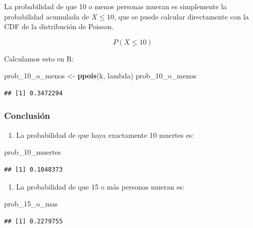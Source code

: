 \documentclass[
]{article}
\newenvironment{Shaded}{\begin{snugshade}}{\end{snugshade}}
\newcommand{\FunctionTok}[1]{\textcolor[rgb]{0.13,0.29,0.53}{\textbf{#1}}}
\newcommand{\NormalTok}[1]{#1}
\newcommand{\OtherTok}[1]{\textcolor[rgb]{0.56,0.35,0.01}{#1}}
\providecommand{\tightlist}{%
  \setlength{\itemsep}{0pt}\setlength{\parskip}{0pt}}
\begin{document}
La probabilidad de que 10 o menos personas mueran es simplemente la probabilidad acumulada de \(X \leq 10\), que se puede calcular directamente con la CDF de la distribución de Poisson.

\[ P(X \leq 10) \]

Calculamos esto en R:

\begin{Shaded}
\begin{Highlighting}[]
\NormalTok{prob\_10\_o\_menos }\OtherTok{\textless{}{-}} \FunctionTok{ppois}\NormalTok{(k, lambda)}
\NormalTok{prob\_10\_o\_menos}
\end{Highlighting}
\end{Shaded}

\begin{verbatim}
## [1] 0.3472294
\end{verbatim}

\subsubsection{Conclusión}\label{conclusiuxf3n}

\begin{enumerate}
\def\labelenumi{\arabic{enumi}.}
\tightlist
\item
  La probabilidad de que haya exactamente 10 muertes es:
\end{enumerate}

\begin{Shaded}
\begin{Highlighting}[]
\NormalTok{prob\_10\_muertes}
\end{Highlighting}
\end{Shaded}

\begin{verbatim}
## [1] 0.1048373
\end{verbatim}

\begin{enumerate}
\def\labelenumi{\arabic{enumi}.}
\setcounter{enumi}{1}
\tightlist
\item
  La probabilidad de que 15 o más personas mueran es:
\end{enumerate}

\begin{Shaded}
\begin{Highlighting}[]
\NormalTok{prob\_15\_o\_mas}
\end{Highlighting}
\end{Shaded}

\begin{verbatim}
## [1] 0.2279755
\end{verbatim}
\end{document}
